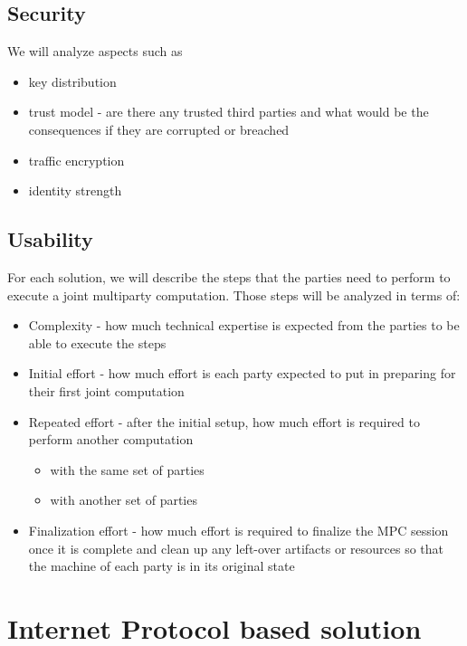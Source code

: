 \hypertarget{security}{%
\section{Security}\label{security}}

We will analyze aspects such as

\begin{itemize}
\tightlist
\item
  key distribution
\item
  trust model - are there any trusted third parties and what would be
  the consequences if they are corrupted or breached
\item
  traffic encryption
\item
  identity strength
\end{itemize}

\hypertarget{usability}{%
\section{Usability}\label{usability}}

For each solution, we will describe the steps that the parties need to
perform to execute a joint multiparty computation. Those steps will be
analyzed in terms of:

\begin{itemize}
\tightlist
\item
  Complexity - how much technical expertise is expected from the parties
  to be able to execute the steps
\item
  Initial effort - how much effort is each party expected to put in
  preparing for their first joint computation
\item
  Repeated effort - after the initial setup, how much effort is required
  to perform another computation

  \begin{itemize}
  \tightlist
  \item
    with the same set of parties
  \item
    with another set of parties
  \end{itemize}
\item
  Finalization effort - how much effort is required to finalize the MPC
  session once it is complete and clean up any left-over artifacts or
  resources so that the machine of each party is in its original state
\end{itemize}

\hypertarget{internet-protocol-based-solution}{%
\chapter{Internet Protocol based
solution}\label{internet-protocol-based-solution}}


